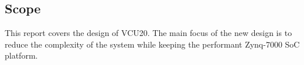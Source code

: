 
%       

\subsection{Scope}

This report covers the design of VCU20. The main focus of the new design is to reduce the complexity of the system while keeping the performant Zynq-7000 SoC platform. 









